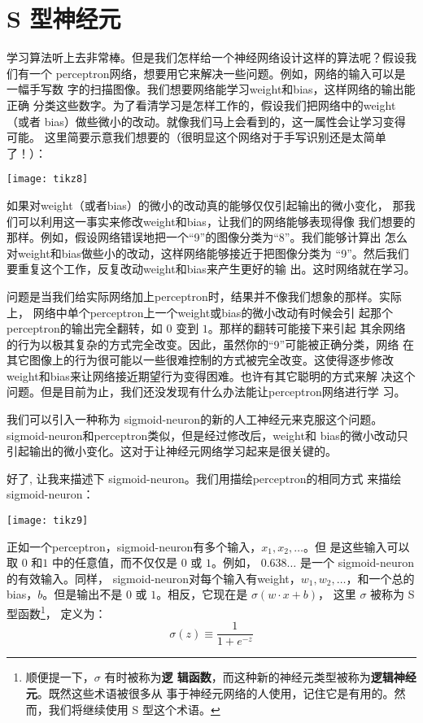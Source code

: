 \section{S 型神经元}
\label{seq:sigmoid_neurons}

学习算法听上去非常棒。但是我们怎样给一个神经网络设计这样的算法呢？假设我们有一个%
\gls*{perceptron}网络，想要用它来解决一些问题。例如，网络的输入可以是一幅手写数
字的扫描图像。我们想要网络能学习\gls*{weight}和\gls*{bias}，这样网络的输出能正确
分类这些数字。为了看清学习是怎样工作的，假设我们把网络中的\gls*{weight}（或者%
  \gls*{bias}）做些微小的改动。就像我们马上会看到的，这一属性会让学习变得可能。
这里简要示意我们想要的（很明显这个网络对于手写识别还是太简单了！）：
\begin{center}
  \texttt{[image: tikz8]}  
\end{center}

如果对\gls*{weight}（或者\gls*{bias}）的微小的改动真的能够仅仅引起输出的微小变化，
那我们可以利用这一事实来修改\gls*{weight}和\gls*{bias}，让我们的网络能够表现得像
我们想要的那样。例如，假设网络错误地把一个“9”的图像分类为“8”。我们能够计算出
怎么对\gls*{weight}和\gls*{bias}做些小的改动，这样网络能够接近于把图像分类为
“9”。然后我们要重复这个工作，反复改动\gls*{weight}和\gls*{bias}来产生更好的输
出。这时网络就在学习。

问题是当我们给实际网络加上\gls*{perceptron}时，结果并不像我们想象的那样。实际上，
网络中单个\gls*{perceptron}上一个\gls*{weight}或\gls*{bias}的微小改动有时候会引
起那个\gls*{perceptron}的输出完全翻转，如 $0$ 变到 $1$。那样的翻转可能接下来引起
其余网络的行为以极其复杂的方式完全改变。因此，虽然你的“9”可能被正确分类，网络
在其它图像上的行为很可能以一些很难控制的方式被完全改变。这使得逐步修改%
\gls*{weight}和\gls*{bias}来让网络接近期望行为变得困难。也许有其它聪明的方式来解
决这个问题。但是目前为止，我们还没发现有什么办法能让\gls*{perceptron}网络进行学
习。

我们可以引入一种称为 \gls*{sigmoid-neuron}的新的人工神经元来克服这个问题。%
\gls*{sigmoid-neuron}和\gls*{perceptron}类似，但是经过修改后，\gls*{weight}和%
\gls*{bias}的微小改动只引起输出的微小变化。这对于让神经元网络学习起来是很关键的。

好了, 让我来描述下 \gls*{sigmoid-neuron}。我们用描绘\gls*{perceptron}的相同方式
来描绘 \gls*{sigmoid-neuron}：
\begin{center}
  \texttt{[image: tikz9]}
\end{center}

正如一个\gls*{perceptron}，\gls*{sigmoid-neuron}有多个输入，$x_1,x_2,\ldots$。但
是这些输入可以取 $0$ 和$1$ 中的任意值，而不仅仅是 $0$ 或 $1$。例如，
$0.638\ldots$ 是一个 \gls*{sigmoid-neuron}的有效输入。同样，
\gls*{sigmoid-neuron}对每个输入有\gls*{weight}，$w_1,w_2,\ldots$，和一个总的%
\gls*{bias}，$b$。但是输出不是 $0$ 或 $1$。相反，它现在是 $\sigma(w \cdot x+b)$，
这里 $\sigma$ 被称为 S型函数\footnote{顺便提一下，$\sigma$ 有时被称为\textbf{逻
    辑函数}，而这种新的神经元类型被称为\textbf{逻辑神经元}。既然这些术语被很多从
  事于神经元网络的人使用，记住它是有用的。然而，我们将继续使用 S 型这个术语。}，
定义为：
\begin{equation}
  \sigma(z) \equiv \frac{1}{1+e^{-z}}
  \label{eq:3}\tag{3}
\end{equation}

